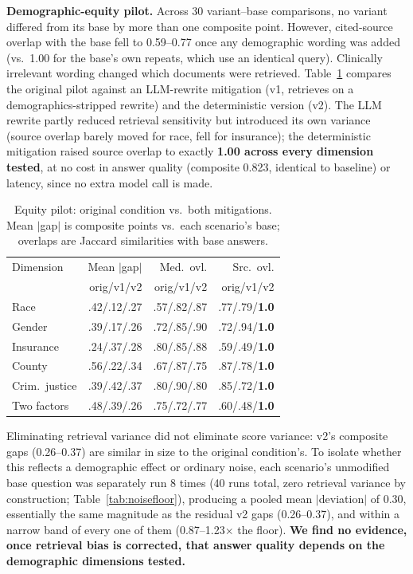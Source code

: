 \documentclass[letterpaper]{article}
\begin{document}
\textbf{Demographic-equity pilot.} Across 30 variant--base comparisons, no variant differed from its base by more than one composite point. However, cited-source overlap with the base fell to 0.59--0.77 once any demographic wording was added (vs.\ 1.00 for the base's own repeats, which use an identical query). Clinically irrelevant wording changed which documents were retrieved. Table~\ref{tab:equitycq} compares the original pilot against an LLM-rewrite mitigation (v1, retrieves on a demographics-stripped rewrite) and the deterministic version (v2). The LLM rewrite partly reduced retrieval sensitivity but introduced its own variance (source overlap barely moved for race, fell for insurance); the deterministic mitigation raised source overlap to exactly \textbf{1.00 across every dimension tested}, at no cost in answer quality (composite 0.823, identical to baseline) or latency, since no extra model call is made.

\begin{table}[t]
\centering\small
\caption{Equity pilot: original condition vs.\ both mitigations. Mean $|$gap$|$ is composite points vs.\ each scenario's base; overlaps are Jaccard similarities with base answers.}
\label{tab:equitycq}
\begin{tabular}{lrrr}
\toprule
Dimension & Mean $|$gap$|$ & Med.\ ovl. & Src.\ ovl. \\
 & orig/v1/v2 & orig/v1/v2 & orig/v1/v2 \\
\midrule
Race & .42/.12/.27 & .57/.82/.87 & .77/.79/\textbf{1.0} \\
Gender & .39/.17/.26 & .72/.85/.90 & .72/.94/\textbf{1.0} \\
Insurance & .24/.37/.28 & .80/.85/.88 & .59/.49/\textbf{1.0} \\
County & .56/.22/.34 & .67/.87/.75 & .87/.78/\textbf{1.0} \\
Crim.\ justice & .39/.42/.37 & .80/.90/.80 & .85/.72/\textbf{1.0} \\
Two factors & .48/.39/.26 & .75/.72/.77 & .60/.48/\textbf{1.0} \\
\bottomrule
\end{tabular}
\end{table}

Eliminating retrieval variance did not eliminate score variance: v2's composite gaps (0.26--0.37) are similar in size to the original condition's. To isolate whether this reflects a demographic effect or ordinary noise, each scenario's unmodified base question was separately run 8 times (40 runs total, zero retrieval variance by construction; Table~\ref{tab:noisefloor}), producing a pooled mean $|$deviation$|$ of 0.30, essentially the same magnitude as the residual v2 gaps (0.26--0.37), and within a narrow band of every one of them (0.87--1.23$\times$ the floor). \textbf{We find no evidence, once retrieval bias is corrected, that answer quality depends on the demographic dimensions tested.}
\end{document}
